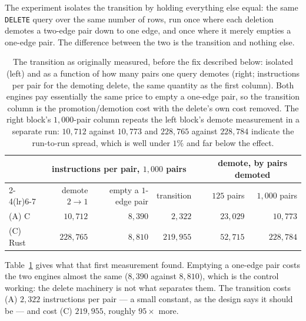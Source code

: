 \documentclass[11pt,a4paper]{article}
\theoremstyle{plain}
\theoremstyle{definition}
\theoremstyle{remark}
\begin{document}
The experiment isolates the transition by holding everything else equal: the
same \texttt{DELETE} query over the same number of rows, run once where each
deletion demotes a two-edge pair down to one edge, and once where it merely
empties a one-edge pair. The difference between the two is the transition and
nothing else.

\begin{table}[!ht]
\centering
\small
\begin{tabular}{@{}lrrrcrr@{}}
\toprule
 & \multicolumn{3}{c}{instructions per pair, $1{,}000$ pairs} & & \multicolumn{2}{c}{demote, by pairs demoted} \\
\cmidrule(lr){2-4}\cmidrule(lr){6-7}
 & demote $2 \to 1$ & empty a $1$-edge pair & transition & & $125$ pairs & $1{,}000$ pairs \\
\midrule
(A) C    & $10{,}712$  & $8{,}390$ & $2{,}322$   & & $23{,}029$ & $10{,}773$  \\
(C) Rust & $228{,}765$ & $8{,}810$ & $219{,}955$ & & $52{,}715$ & $228{,}784$ \\
\bottomrule
\end{tabular}
\caption{The transition as originally measured, before the fix described
below: isolated (left) and as a function of how many pairs one query demotes
(right; instructions per pair for the demoting delete, the same quantity as the
first column). Both engines pay essentially the same price
to empty a one-edge pair, so the transition column is the promotion/demotion
cost with the delete's own cost removed. The right block's $1{,}000$-pair column repeats
the left block's demote measurement in a separate run: $10{,}712$ against
$10{,}773$ and $228{,}765$ against $228{,}784$ indicate the run-to-run spread,
which is well under $1\%$ and far below the effect.}
\label{tab:evalosc}
\end{table}

Table~\ref{tab:evalosc} gives what that first measurement found. Emptying a
one-edge pair costs the two engines almost the same ($8{,}390$ against
$8{,}810$), which is the control working: the delete machinery is not what
separates them. The transition costs (A) $2{,}322$ instructions per pair --- a
small constant, as the design says it should be --- and cost (C) $219{,}955$,
roughly $95\times$ more.
\end{document}
